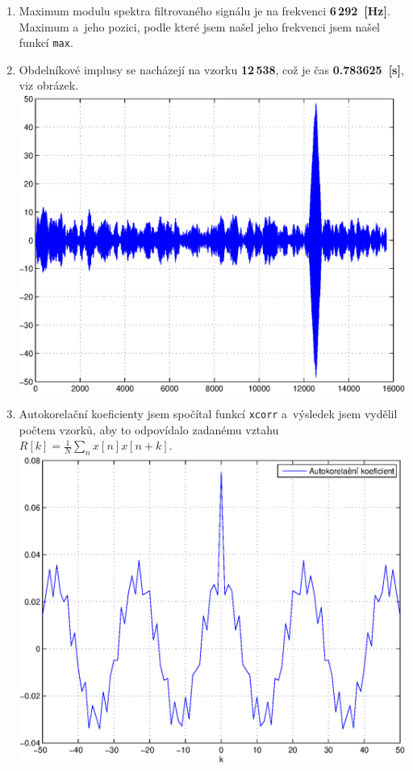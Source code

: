 \documentclass[a4paper, 11pt, twocolumn]{article}
\begin{document}
\begin{enumerate}
		\item
			Maximum modulu spektra filtrovaného signálu je na frekvenci \textbf{6\,292~[Hz]}.
			Maximum a~jeho pozici, podle které jsem našel jeho frekvenci jsem našel funkcí \texttt{max}.

		\item
			Obdelníkové implusy se nacházejí na vzorku \textbf{12\,538}, což je čas
			\textbf{0.783625~[s]}, viz obrázek.
			\\ \includegraphics[width=\linewidth]{inc/8.eps}

		\item
			Autokorelační koeficienty jsem spočítal funkcí \texttt{xcorr} a~výsledek jsem
			vydělil počtem vzorků, aby to odpovídalo zadanému vztahu
			$ R[k] = \frac{1}{N} \sum\limits_n x[n] x[n+k] $.
			\\ \includegraphics[width=\linewidth]{inc/9.eps}


\end{enumerate}
\end{document}
